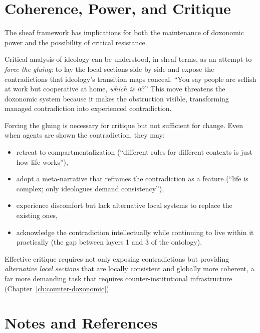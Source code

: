 \section{Coherence, Power, and Critique}
\label{sec:ch12-critique}

The sheaf framework has implications for both the maintenance of doxonomic power and the possibility of critical resistance.

\begin{proposition}
\label{prop:critique-as-gluing}
Critical analysis of ideology can be understood, in sheaf terms, as an attempt to \emph{force the gluing}: to lay the local sections side by side and expose the contradictions that ideology's transition maps conceal.
``You say people are selfish at work but cooperative at home, \emph{which is it}?''
This move threatens the doxonomic system because it makes the obstruction visible, transforming managed contradiction into experienced contradiction.
\end{proposition}

\begin{remark}
\label{rem:critique-failure}
Forcing the gluing is necessary for critique but not sufficient for change.
Even when agents are shown the contradiction, they may:
\begin{itemize}[nosep]
  \item retreat to compartmentalization (``different rules for different contexts is just how life works''),
  \item adopt a meta-narrative that reframes the contradiction as a feature (``life is complex; only ideologues demand consistency''),
  \item experience discomfort but lack alternative local systems to replace the existing ones,
  \item acknowledge the contradiction intellectually while continuing to live within it practically (the gap between layers 1 and 3 of the ontology).
\end{itemize}
Effective critique requires not only exposing contradictions but providing \emph{alternative local sections} that are locally consistent and globally more coherent, a far more demanding task that requires counter-institutional infrastructure (Chapter~\ref{ch:counter-doxonomic}).
\end{remark}


\section{Notes and References}
\label{sec:ch12-notes}

